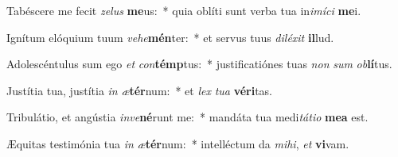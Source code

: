 \item Tabéscere me fecit \textit{ze}\textit{lus} \textbf{me}us:~* quia oblíti sunt verba tua in\textit{i}\textit{mí}\textit{ci} \textbf{me}i.
\item Ignítum elóquium tuum \textit{ve}\textit{he}\textbf{mén}ter:~* et servus tuus \textit{di}\textit{lé}\textit{xit} \textbf{il}lud.
\item Adolescéntulus sum ego \textit{et} \textit{con}\textbf{témp}tus:~* justificatiónes tuas \textit{non} \textit{sum} \textit{ob}\textbf{lí}tus.
\item Justítia tua, justítia \textit{in} \textit{æ}\textbf{tér}num:~* et \textit{lex} \textit{tu}\textit{a} \textbf{vé}\textbf{ri}tas.
\item Tribulátio, et angústia \textit{in}\textit{ve}\textbf{né}runt me:~* mandáta tua medi\textit{tá}\textit{ti}\textit{o} \textbf{me}\textbf{a} est.
\item Æquitas testimónia tua \textit{in} \textit{æ}\textbf{tér}num:~* intelléctum da \textit{mi}\textit{hi}, \textit{et} \textbf{vi}vam.
